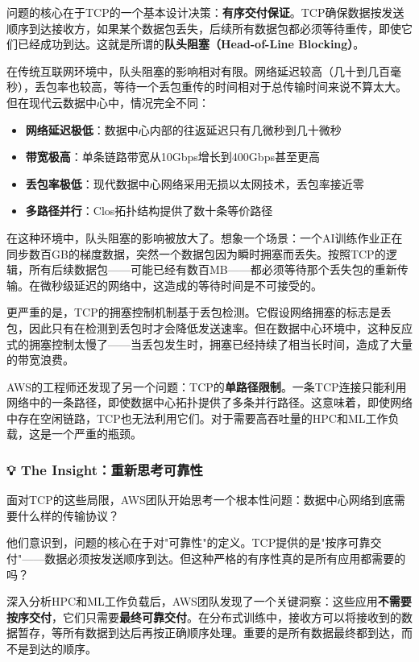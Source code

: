 问题的核心在于TCP的一个基本设计决策：\textbf{有序交付保证}。TCP确保数据按发送顺序到达接收方，如果某个数据包丢失，后续所有数据包都必须等待重传，即使它们已经成功到达。这就是所谓的\textbf{队头阻塞（Head-of-Line Blocking）}。

在传统互联网环境中，队头阻塞的影响相对有限。网络延迟较高（几十到几百毫秒），丢包率也较高，等待一个丢包重传的时间相对于总传输时间来说不算太大。但在现代云数据中心中，情况完全不同：

\begin{itemize}
    \item \textbf{网络延迟极低}：数据中心内部的往返延迟只有几微秒到几十微秒
    \item \textbf{带宽极高}：单条链路带宽从10Gbps增长到400Gbps甚至更高
    \item \textbf{丢包率极低}：现代数据中心网络采用无损以太网技术，丢包率接近零
    \item \textbf{多路径并行}：Clos拓扑结构提供了数十条等价路径
\end{itemize}

在这种环境中，队头阻塞的影响被放大了。想象一个场景：一个AI训练作业正在同步数百GB的梯度数据，突然一个数据包因为瞬时拥塞而丢失。按照TCP的逻辑，所有后续数据包——可能已经有数百MB——都必须等待那个丢失包的重新传输。在微秒级延迟的网络中，这造成的等待时间是不可接受的。

更严重的是，TCP的拥塞控制机制基于丢包检测。它假设网络拥塞的标志是丢包，因此只有在检测到丢包时才会降低发送速率。但在数据中心环境中，这种反应式的拥塞控制太慢了——当丢包发生时，拥塞已经持续了相当长时间，造成了大量的带宽浪费。

AWS的工程师还发现了另一个问题：TCP的\textbf{单路径限制}。一条TCP连接只能利用网络中的一条路径，即使数据中心拓扑提供了多条并行路径。这意味着，即使网络中存在空闲链路，TCP也无法利用它们。对于需要高吞吐量的HPC和ML工作负载，这是一个严重的瓶颈。

\subsubsection{💡 The Insight：重新思考可靠性}

面对TCP的这些局限，AWS团队开始思考一个根本性问题：数据中心网络到底需要什么样的传输协议？

他们意识到，问题的核心在于对"可靠性"的定义。TCP提供的是"按序可靠交付"——数据必须按发送顺序到达。但这种严格的有序性真的是所有应用都需要的吗？

深入分析HPC和ML工作负载后，AWS团队发现了一个关键洞察：这些应用\textbf{不需要按序交付}，它们只需要\textbf{最终可靠交付}。在分布式训练中，接收方可以将接收到的数据暂存，等所有数据到达后再按正确顺序处理。重要的是所有数据最终都到达，而不是到达的顺序。

